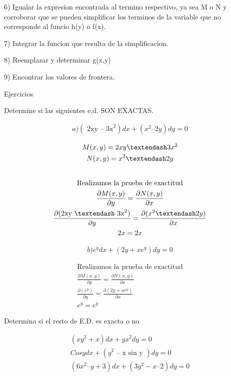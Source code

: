 \documentclass{article}
\begin{document}
6) Igualar la expresion encontrada al termino respectivo, ya sea M o N y corroborar que se pueden simplificar los terminos de la variable que no corresponde al funcio h(y) o f(x).

7) Integrar la funcion que resulta de la simplificacion.

8) Reemplazar y determinar g(x,y)

9) Encontrar los valores de frontera.

Ejercicios

Determine si las siguientes e.d. SON EXACTAS.


\begin{gather*}
a) (\text{ 2xy – 3x}^{2} ) dx + ( x^{2} – 2y ) dy = 0
\end{gather*}





\begin{gather*}
M(x,y) = 2xy – 3x^{2} \\
N(x,y)=x^{2} – 2y \\
\vspace{0.5em} \\
\text{Realizamos la prueba de exactitud} \\
\frac{\partial M(x,y)}{\partial y} = \frac{\partial N(x,y)}{\partial x}  \\
\frac{\partial (\text{2xy – 3x}^{2})}{\partial y} = \frac{\partial (x^{2} – 2y)}{\partial x} \\
2x = 2x
\end{gather*}



\begin{gather*}
b) e^{y} dx + ( 2y + xe^{y} ) dy = 0
\end{gather*}



\begin{gather*}
\text{Realizamos la prueba de exactitud} \\
\frac{\partial M(x,y)}{\partial y} = \frac{\partial N(x,y)}{\partial x}  \\
\frac{\partial (e^{y})}{\partial y} = \frac{\partial ( 2y + xe^{y} )}{\partial x} \\
e^{y}=e^{y}
\end{gather*}


Determina si el resto de E.D. es exacta o no


\begin{gather*}
( xy^{2} + x ) dx + yx^{2}dy = 0 \\
Cos y dx + ( y^{2}\text{ – x sin y }) dy = 0 \\
( 6x^{2} – y +3 ) dx + (3y^{2} -x – 2) dy =0
\end{gather*}
\end{document}

